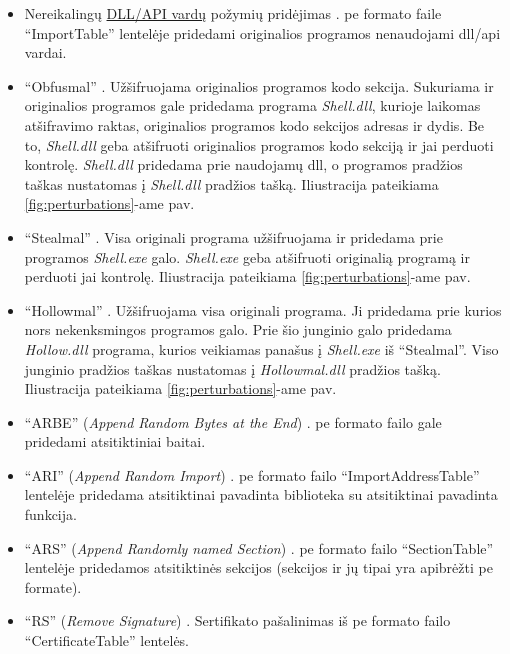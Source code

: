 \begin{itemize}
    \item Nereikalingų \hyperref[feature:dll]{DLL/API vardų} požymių pridėjimas \cite{huGeneratingAdversarialMalware2017}. \acs{pe} formato faile \enquote{ImportTable} lentelėje pridedami originalios programos nenaudojami \acs{dll}/\acs{api} vardai.
    \item \enquote{Obfusmal} \cite{zhongMalFoxCamouflagedAdversarial2024}. Užšifruojama originalios programos kodo sekcija. Sukuriama ir originalios programos gale pridedama programa \textit{Shell.dll}, kurioje laikomas atšifravimo raktas, originalios programos kodo sekcijos adresas ir dydis. Be to, \textit{Shell.dll} geba atšifruoti originalios programos kodo sekciją ir jai perduoti kontrolę. \textit{Shell.dll} pridedama prie naudojamų \acs{dll}, o programos pradžios taškas nustatomas į \textit{Shell.dll} pradžios tašką. Iliustracija pateikiama \ref{fig:perturbations}-ame pav.
    \item \enquote{Stealmal} \cite{zhongMalFoxCamouflagedAdversarial2024}. Visa originali programa užšifruojama ir pridedama prie programos \textit{Shell.exe} galo. \textit{Shell.exe} geba atšifruoti originalią programą ir perduoti jai kontrolę. Iliustracija pateikiama \ref{fig:perturbations}-ame pav.
    \item \enquote{Hollowmal} \cite{zhongMalFoxCamouflagedAdversarial2024}. Užšifruojama visa originali programa. Ji pridedama prie kurios nors nekenksmingos programos galo. Prie šio junginio galo pridedama \textit{Hollow.dll} programa, kurios veikiamas panašus į \textit{Shell.exe} iš \enquote{Stealmal}. Viso junginio pradžios taškas nustatomas į \textit{Hollowmal.dll} pradžios tašką. Iliustracija pateikiama \ref{fig:perturbations}-ame pav.
    \item \enquote{ARBE} (\textit{Append Random Bytes at the End}) \cite{fangEvadingMalwareEngines2019}. \acs{pe} formato failo gale pridedami atsitiktiniai baitai.
    \item \enquote{ARI} (\textit{Append Random Import}) \cite{fangEvadingMalwareEngines2019}. \acs{pe} formato failo \enquote{ImportAddressTable} lentelėje pridedama atsitiktinai pavadinta biblioteka su atsitiktinai pavadinta funkcija.
    \item \enquote{ARS} (\textit{Append Randomly named Section}) \cite{fangEvadingMalwareEngines2019}. \acs{pe} formato failo \enquote{SectionTable} lentelėje pridedamos atsitiktinės sekcijos (sekcijos ir jų tipai yra apibrėžti \acs{pe} formate).
    \item \enquote{RS} (\textit{Remove Signature}) \cite{fangEvadingMalwareEngines2019}. Sertifikato pašalinimas iš \acs{pe} formato failo \enquote{CertificateTable} lentelės.

\end{itemize}
